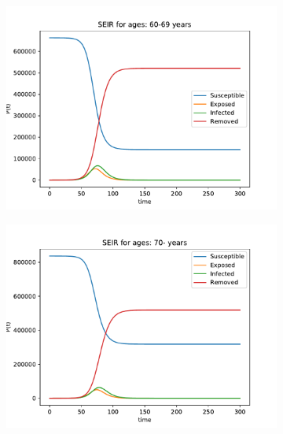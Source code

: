 \begin{figure}[H]
\begin{subfigure}{0.40\textwidth}
\includegraphics[width = \textwidth]{../fig/SEIR_60-69_q.pdf}
\caption{\protect}
\end{subfigure}
\begin{subfigure}{0.40\textwidth}
\includegraphics[width = \textwidth]{../fig/SEIR_70-_q.pdf}
\caption{\protect}
\end{subfigure}
\end{figure}
